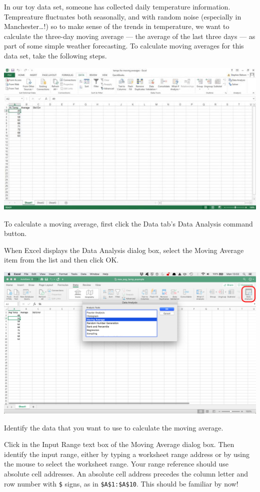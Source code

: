 \documentclass[
]{book}
\begin{document}
In our toy data set, someone has collected daily temperature information. Tempreature fluctuates both seasonally, and with random noise (especially in Manchester\ldots!) so to make sense of the trends in temperature, we want to calculate the three-day moving average --- the average of the last three days --- as part of some simple weather forecasting. To calculate moving averages for this data set, take the following steps.

\includegraphics{imgs/430314.image0.jpg}

To calculate a moving average, first click the Data tab's Data Analysis command button.

When Excel displays the Data Analysis dialog box, select the Moving Average item from the list and then click OK.

\includegraphics{imgs/da_ma.png}

Identify the data that you want to use to calculate the moving average.

Click in the Input Range text box of the Moving Average dialog box. Then identify the input range, either by typing a worksheet range address or by using the mouse to select the worksheet range. Your range reference should use absolute cell addresses. An absolute cell address precedes the column letter and row number with \texttt{\$} signs, as in \texttt{\$A\$1:\$A\$10}. This should be familiar by now!
\end{document}
